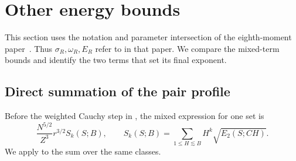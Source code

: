 \section{Other energy bounds}
\label{app:optimal}

This section uses the notation and parameter intersection of the
eighth-moment paper~\cite{Thin}. Thus $\sigma_R,\omega_R,E_R$ refer to
\cite[(\ref*{p-eq:contact})]{Thin} in that paper. We compare the mixed-term bounds
and identify the two terms that set its final exponent.

\subsection{Direct summation of the pair profile}
Before the weighted Cauchy step in \cite[Appendix A]{Thin}, the mixed expression for
one set is
\[
 \frac{N^{5/2}}{Z^3}r^{3/2}S_k(S;B),\qquad
 S_k(S;B)=\sum_{1\le H\lesssim B}H^k\sqrt{E_2(S;CH)}.
\]
We apply \cite[(\ref*{p-eq:pairbound})]{Thin} to the sum over the same classes.

